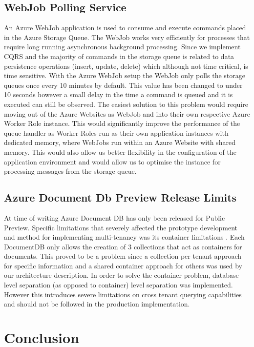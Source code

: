 \subsection{WebJob Polling Service}
An Azure WebJob application is used to consume and execute commands placed in the Azure Storage Queue. The WebJob works very efficiently for processes that require long running asynchronous background processing. Since we implement CQRS and the majority of commands in the storage queue is related to data persistence operations (insert, update, delete) which although not time critical, is time sensitive. With the Azure WebJob setup the WebJob only polls the storage queues once every 10 minutes by default. This value has been changed to under 10 seconds however a small delay in the time a command is queued and it is executed can still be observed. The easiest solution to this problem would require moving out of the Azure Websites as WebJob and into their own respective Azure Worker Role instance. This would significantly improve the performance of the queue handler as Worker Roles run as their own application instances with dedicated memory, where WebJobs run within an Azure Website with shared memory. This would also allow us better flexibility in the configuration of the application environment and would allow us to optimise the instance for processing messages from the storage queue.

\subsection{Azure Document Db Preview Release Limits}
At time of writing Azure Document DB has only been released for Public Preview. Specific limitations that severely affected the prototype development and method for implementing multi-tenancy  was its container limitations \cite{AzureLimits}. Each DocumentDB only allows the creation of 3 collections that act as containers for documents. This proved to be a problem since a collection per tenant approach for specific information and a shared container approach for others was used by our architecture description. In order to solve the container problem, database level separation (as opposed to container) level separation was implemented. However this introduces severe limitations on cross tenant querying capabilities and should not be followed in the production implementation.

\section{Conclusion}

